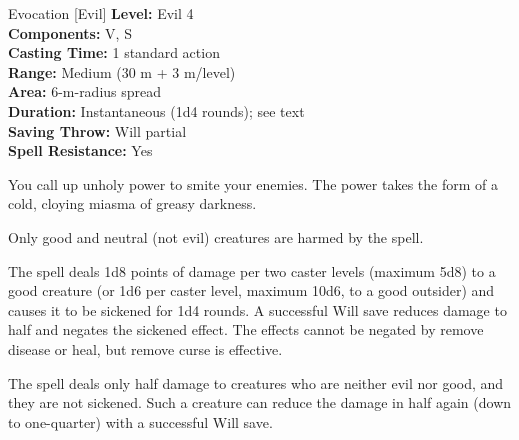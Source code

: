 {Evocation [Evil]}
{
	\textbf{Level:}
	Evil 4\\
	\textbf{Components:}
	V, S\\
	\textbf{Casting Time:}
	1 standard action\\
	\textbf{Range:}
	Medium (30 m + 3 m/level)\\
	\textbf{Area:}
	6-m-radius spread\\
	\textbf{Duration:}
	Instantaneous (1d4 rounds); see text\\
	\textbf{Saving Throw:}
	Will partial\\
	\textbf{Spell Resistance:}
	Yes\\
}
{
	You call up unholy power to smite your enemies. The power takes the form of a cold, cloying miasma of greasy darkness.

	Only good and neutral (not evil) creatures are harmed by the spell.

	The spell deals 1d8 points of damage per two caster levels (maximum 5d8) to a good creature (or 1d6 per caster level, maximum 10d6, to a good outsider) and causes it to be sickened for 1d4 rounds. A successful Will save reduces damage to half and negates the sickened effect. The effects cannot be negated by remove disease or heal, but remove curse is effective.

	The spell deals only half damage to creatures who are neither evil nor good, and they are not sickened. Such a creature can reduce the damage in half again (down to one-quarter) with a successful Will save.

}
